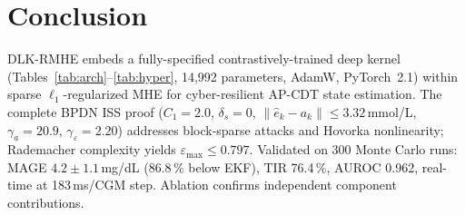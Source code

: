 \documentclass[journal,twoside]{IEEEtran}
\newcommand{\ehat}{\hat{e}}
\begin{document}
\section{Conclusion}\label{sec:conclusion}

DLK-RMHE embeds a fully-specified contrastively-trained deep kernel
(Tables~\ref{tab:arch}--\ref{tab:hyper}, 14,992 parameters, AdamW, PyTorch~2.1)
within sparse $\ell_1$-regularized MHE for cyber-resilient AP-CDT state estimation.
The complete BPDN ISS proof ($C_1{=}2.0$, $\delta_s{=}0$, $\|\ehat_k{-}a_k\|\leq
3.32$\,mmol/L, $\gamma_a{=}20.9$, $\gamma_\varepsilon{=}2.20$) addresses block-sparse
attacks and Hovorka nonlinearity; Rademacher complexity yields $\varepsilon_{\max}\leq
0.797$. Validated on 300 Monte Carlo runs: MAGE $4.2{\pm}1.1$\,mg/dL (86.8\,\% below
EKF), TIR 76.4\,\%, AUROC 0.962, real-time at 183\,ms/CGM step.
Ablation confirms independent component contributions.



\end{document}
